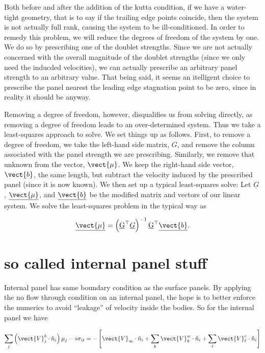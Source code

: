 Both before and after the addition of the kutta condition, if we have a water-tight geometry, that is to say if the trailing edge points coincide, then the system is not actually full rank, causing the system to be ill-conditioned.
In order to remedy this problem, we will reduce the degrees of freedom of the system by one.
We do so by prescribing one of the doublet strengths.
Since we are not actually concerned with the overall magnitude of the doublet strengths (since we only need the inducded velocities), we can actually prescribe an arbitrary panel strength to an arbitrary value.
That being said, it seems an itelligent choice to prescribe the panel nearest the leading edge stagnation point to be zero, since in reality it should be anyway.

Removing a degree of freedom, however, disqualifies us from solving directly, as removing a degree of freedom leads to an over-determined system.
Thus we take a least-squares approach to solve.
We set things up as follows.
First, to remove a degree of freedom, we take the left-hand side matrix, \(G\), and remove the column associated with the panel strength we are prescribing.
Similarly, we remove that unknown from the vector, \(\vect{\mu}\).
We keep the right-hand side vector, \(\vect{b}\), the same length, but subtract the velocity induced by the prescribed panel (since it is now known).
We then set up a typical least-squares solve: Let \(\underline{G}\), \(\underline{\vect{\mu}}\), and \(\underline{\vect{b}}\) be the modified matrix and vectors of our linear system.
We solve the least-squares problem in the typical way as

\begin{equation}
    \underline{\vect{\mu}} = \left( \underbar{G}^\top  \underline{G} \right)^{-1} \underbar{G}^\top  \underline{\vect{b}}.
\end{equation}


\section{so called internal panel stuff }

Internal panel has same boundary condition as the surface panels.
By applying the no flow through condition on an internal panel, the hope is to better enforce the numerics to avoid ``leakage'' of velocity inside the bodies.
So for the internal panel we have

\begin{equation}
    \sum_j \left(\vect{V}^b_j \cdot \hat{n}_i\right)\mu_j - s\sigma_{it} = - \left[ \vect{V}_\infty \cdot \hat{n}_i +%
    \sum_k \vect{V}^w_k \cdot \hat{n}_i +%
    \sum_\ell \vect{V}^r_\ell \cdot \hat{n}_i \right]
\end{equation}

